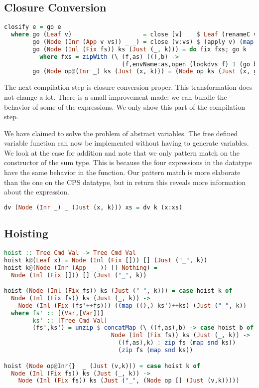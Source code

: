 \subsection{\label{subsection:closconvert2}Closure Conversion}
\begin{lstlisting}[language=Haskell]
closify e = go e
  where go (Leaf v)                    = close [v]    $ Leaf (renameC v)
        go (Node (Inr (App v vs)) _ _) = close (v:vs) $ (apply v) (map renameC vs)
        go (Node (Inl (Fix fs)) ks (Just (_, k))) = do fix fxs; go k
          where fxs = zipWith (\ (f,as) ((),b) ->
                                 (f,envName:as,open (lookdvs f) 1 (go b))) fs ks
        go (Node op@(Inr _) ks (Just (x, k))) = (Node op ks (Just (x, go k)))
\end{lstlisting}

The next compilation step is closure conversion proper. This transformation does not change a lot. There is a small improvement made: we can bundle the behavior of some of the  expressions. We only show this part of the compilation step.

We have claimed to solve the problem of abstract variables. The free defined variable function  can now be implemented without having to generate variables. We look at the case for addition and note that we only pattern match on the constructor of the sum type. This is because the four expressions in the  datatype have the same behavior in the  function. Our pattern match is more elaborate than the one on the \ac{CPS} datatype, but in return this reveals more information about the expression.

\begin{lstlisting}[language=Haskell]
dv (Node (Inr _) _ (Just (x, k))) xs = dv k (x:xs)
\end{lstlisting}

\subsection{\label{subsection:hoist2}Hoisting}
\begin{lstlisting}[language=Haskell]
hoist :: Tree Cmd Val -> Tree Cmd Val
hoist k@(Leaf x) = Node (Inl (Fix [])) [] (Just ("_", k))
hoist k@(Node (Inr (App _ _)) [] Nothing) =
  Node (Inl (Fix [])) [] (Just ("_", k))

hoist (Node (Inl (Fix fs)) ks (Just ("_", k))) = case hoist k of
  Node (Inl (Fix fs)) ks (Just (_, k)) ->
    Node (Inl (Fix (fs'++fs))) ((map ((),) ks')++ks) (Just ("_", k))
  where fs' :: [(Var,[Var])]
        ks' :: [Tree Cmd Val]
        (fs',ks') = unzip $ concatMap (\ ((f,as),b) -> case hoist b of
                              Node (Inl (Fix fs)) ks (Just (_, k)) ->
                                ((f,as),k) : zip fs (map snd ks))
                                (zip fs (map snd ks))

hoist (Node op@Inr{}  _ (Just (v,k))) = case hoist k of
  Node (Inl (Fix fs)) ks (Just (_, k)) ->
    Node (Inl (Fix fs)) ks (Just ("_", (Node op [] (Just (v,k)))))
\end{lstlisting}


